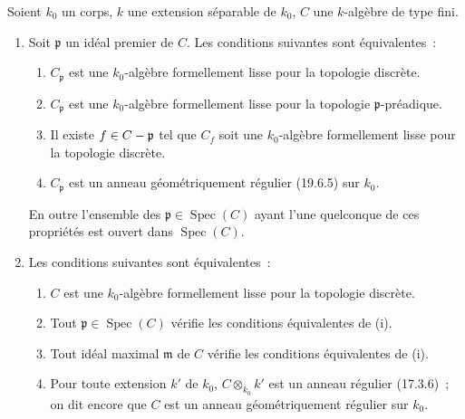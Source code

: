 \begin{proposition}[22.6.7]
\label{0.22.6.7-fr}
Soient $k_0$ un corps, $k$ une extension séparable de $k_0$, $C$ une
$k$-algèbre de type fini.
\begin{enumerate}
  \item[\rm(i)] Soit $\mathfrak p$ un idéal premier de $C$. Les conditions
  suivantes sont équivalentes~:
  \begin{enumerate}
    \item[\textup{a)}] $C_{\mathfrak p}$ est une $k_0$-algèbre formellement lisse pour
    la topologie discrète.
    \item[\textup{b)}] $C_{\mathfrak p}$ est une $k_0$-algèbre formellement lisse pour
    la topologie $\mathfrak p$-préadique.
    \item[\textup{c)}] Il existe $f\in C-\mathfrak p$ tel que $C_f$ soit une
    $k_0$-algèbre formellement lisse pour la topologie discrète.
    \item[\textup{d)}] $C_{\mathfrak p}$ est un anneau géométriquement régulier
    \textup{(19.6.5)} sur $k_0$.
  \end{enumerate}
  En outre l'ensemble des $\mathfrak p\in\operatorname{Spec}(C)$ ayant l'une quelconque de
  ces propriétés est ouvert dans $\operatorname{Spec}(C)$.
  \item[\rm(ii)] Les conditions suivantes sont équivalentes~:
  \begin{enumerate}
    \item[\textup{a)}] $C$ est une $k_0$-algèbre formellement lisse pour la topologie
    discrète.
    \item[\textup{b)}] Tout $\mathfrak p\in\operatorname{Spec}(C)$ vérifie les conditions
    équivalentes de \textup{(i)}.
    \item[\textup{c)}] Tout idéal maximal $\mathfrak m$ de $C$ vérifie les conditions
    équivalentes de \textup{(i)}.
    \item[\textup{d)}] Pour toute extension $k'$ de $k_0$, $C\otimes_{k_0}k'$ est un
    anneau régulier \textup{(17.3.6)}~; on dit encore que $C$ est un anneau
    géométriquement régulier sur $k_0$.
  \end{enumerate}



\end{enumerate}
\end{proposition}

